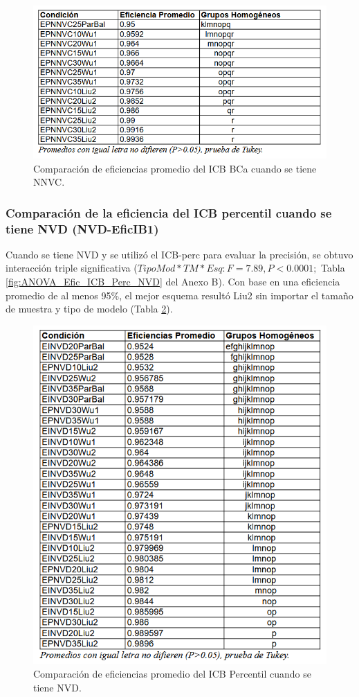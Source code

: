 \begin{figure}[ht] 
	\centering 
	\includegraphics[width=0.76\linewidth]{img/CompEfic_PromICB_BCa_NNVC.png} 
	\caption{Comparación de eficiencias promedio del ICB BCa cuando se tiene NNVC.} 
	\label{fig:CompEfic_PromICB_BCa_NNVC}
\end{figure}
\FloatBarrier




\subsubsection{Comparación de la eficiencia del ICB percentil cuando se tiene NVD (NVD-EficIB1)}

Cuando se tiene NVD y se utilizó el ICB-perc para evaluar la precisión, se obtuvo interacción triple significativa ($TipoMod*TM*Esq: F=7.89, P<0.0001;$ Tabla \ref{fig:ANOVA_Efic_ICB_Perc_NVD} del Anexo B). Con base en una eficiencia promedio de al menos 95\%, el mejor esquema resultó Liu2 sin importar el tamaño de muestra y tipo de modelo (Tabla \ref{fig:CompEfic_PromICB_Perc_NVD}).\\


\begin{figure}[ht] 
	\centering 
	\includegraphics[width=0.76\linewidth]{img/CompEfic_PromICB_Perc_NVD.png} 
	\caption{Comparación de eficiencias promedio del ICB Percentil cuando se tiene NVD.} 
	\label{fig:CompEfic_PromICB_Perc_NVD}
\end{figure}
\FloatBarrier


